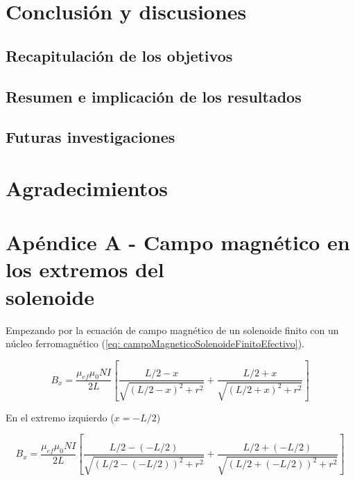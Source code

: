 \documentclass[a4paper,12pt]{article}
\begin{document}
    

\section*{Conclusión y discusiones}

    \subsection*{Recapitulación de los objetivos}



    \subsection*{Resumen e implicación de los resultados}



    \subsection*{Futuras investigaciones}

        

\section*{Agradecimientos}

    

\section*{Apéndice A - Campo magnético en los extremos del \\solenoide}

Empezando por la ecuación de campo magnético de un solenoide finito con un núcleo ferromagnético (\ref{eq: campoMagneticoSolenoideFinitoEfectivo}).

    \begin{equation*}
        B_x = \frac{\mu_{ef}\mu_0 N I}{2L} \left[ \frac{L/2 - x}{\sqrt{(L/2 - x)^2 + r^2}} + \frac{L/2 + x}{\sqrt{(L/2 + x)^2 + r^2}} \right]
    \end{equation*}

    En el extremo izquierdo ($x=-L/2$)

    \begin{equation*}
        B_x = \frac{\mu_{ef}\mu_0 N I}{2L} \left[ \frac{L/2 - (-L/2)}{\sqrt{(L/2 - (-L/2))^2 + r^2}} + \frac{L/2 + (-L/2)}{\sqrt{(L/2 + (-L/2))^2 + r^2}} \right]
    \end{equation*}
\end{document}
